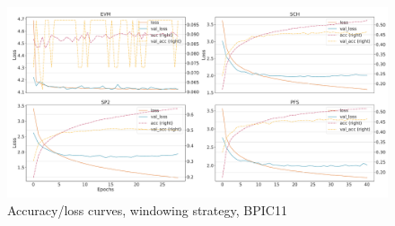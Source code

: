 \begin{figure}[!htb]
    \centering
    \includegraphics[width=\textwidth]{gfx/bpic2011/windowed_loss_acc_curve.pdf}
    \caption{Accuracy/loss curves, windowing strategy, BPIC11}
\end{figure}
\FloatBarrier

